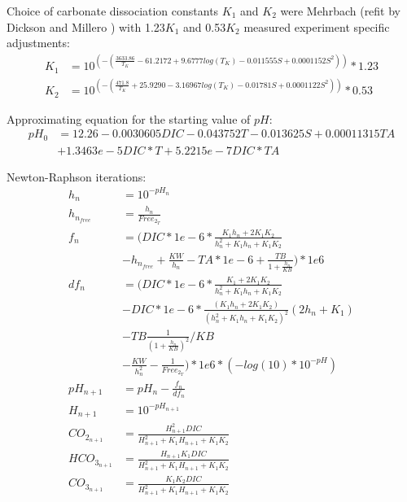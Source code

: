 \documentclass{ruthesis}
\begin{document}
Choice of carbonate dissociation constants $K_1$ and $K_2$ were Mehrbach \cite{mehrbach1973measurement} (refit by Dickson and Millero \cite{dickson1987comparison}) with 1.23$K_1$ and 0.53$K_2$ measured experiment specific adjustments:
\begin{align}
K_1 		&= 10^{(-(\frac{3633.86}{T_K} - 61.2172 + 9.6777 log(T_K) - 0.011555 S + 0.0001152 S^2))}*1.23 \\
K_2 		&= 10^{(-(\frac{471.8}{T_K} + 25.9290 - 3.16967 log(T_K) - 0.01781 S + 0.0001122 S^2))}*0.53 	
\end{align}


Approximating equation for the starting value of $pH$: 
\begin{align}
pH_{0} 	&= 12.26 -0.0030605 DIC -0.043752 T -0.013625 S+ 0.00011315 TA \nonumber \\
&+ 1.3463e-5 DIC*T + 5.2215e-7 DIC*TA  \label{pH_approx_eq}	
\end{align}

Newton-Raphson iterations: 
\begin{align}
h_{n} 			&=  10^{-pH_{n}}\label{newton_raph_iterations1}	 \\
h_{n_{free}}	&=  \frac{h_n}{Free_{2_T}}	 \\
f_n				&= (  DIC*1e-6*\frac{K_1 h_n + 2 K_1 K_2}{h_n^2 + K_1 h_n + K_1 K_2}  \nonumber \\
&  - h_{n_{free}} + \frac{KW}{h_n} - TA*1e-6 + \frac{TB}{1+\frac{h_n}{KB}} )*1e6  \\
df_n 			&= (  DIC*1e-6*\frac{K_1 + 2 K_1 K_2}{h_n^2 + K_1 h_n + K_1 K_2}  \nonumber\\
&  -DIC*1e-6*\frac{(K_1 h_n + 2 K_1 K_2)}{(h_n^2 + K_1 h_n + K_1 K_2)^2}(2h_n + K_1) \nonumber\\
&  -TB \frac{1}{(1+ \frac{h_n}{KB})^2} / KB   \nonumber \\
&  -\frac{KW}{h_n^2} - \frac{1}{Free_{2_T}} )*1e6  * (-log(10)*10^{-pH}) \\
pH_{n+1}		&= pH_n - \frac{f_n}{df_n}  \\
H_{n+1} 		&= 10^{-pH_{n+1}}  \\
CO_{2_{n+1}}  		&= \frac{H_{n+1}^2 DIC}{H_{n+1}^2 + K_1 H_{n+1} + K_1 K_2}  \\
HCO_{3_{n+1}} 		&= \frac{H_{n+1} K_1 DIC}{H_{n+1}^2 + K_1 H_{n+1} + K_1 K_2}  \\
CO_{3_{n+1}}  		&= \frac{K_1 K_2 DIC}{H_{n+1}^2 + K_1 H_{n+1} + K_1 K_2}\label{newton_raph_iterations_end} 
\end{align}
\end{document}
